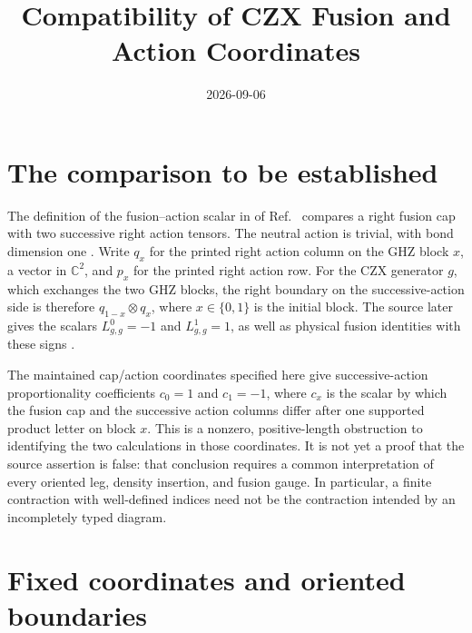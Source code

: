 \documentclass{article}
\title{Compatibility of CZX Fusion and Action Coordinates}
\author{}
\date{2026-09-06}
\begin{document}
\maketitle
{}

\section{The comparison to be established}

The definition of the fusion--action scalar in
 of
Ref.~\cite[lines~1875--1913]{FrancoRubio2025MPUGauging} compares a right fusion cap with two successive right action tensors. The neutral action is trivial, with bond dimension one
\cite[line~1937]{FrancoRubio2025MPUGauging}. Write $q_x$ for the printed right action column on the GHZ block $x$, a vector in $\mathbb C^2$, and $p_x$ for the printed right action row. For the CZX generator $g$, which exchanges the two GHZ blocks, the right boundary on the successive-action side is therefore $q_{1-x}\otimes q_x$, where $x\in\{0,1\}$ is the initial block. The source later gives the scalars $L^0_{g,g}=-1$ and $L^1_{g,g}=1$, as well as physical fusion identities with these signs
\cite[lines~4695--4699 and 4989--5067]{FrancoRubio2025MPUGauging}.

The maintained cap/action coordinates specified here give successive-action proportionality coefficients $c_0=1$ and $c_1=-1$, where $c_x$ is the scalar by which the fusion cap and the successive action columns differ after one supported product letter on block $x$. This is a nonzero, positive-length obstruction to identifying the two calculations in those coordinates. It is not yet a proof that the source assertion is false: that conclusion requires a common interpretation of every oriented leg, density insertion, and fusion gauge. In particular, a finite contraction with well-defined indices need not be the contraction intended by an incompletely typed diagram.

\section{Fixed coordinates and oriented boundaries}
\end{document}
